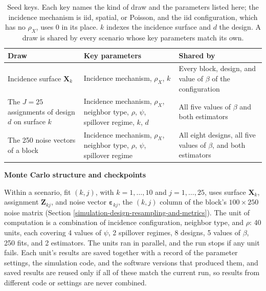 \documentclass[11pt]{article}
\newcommand{\sihead}[1]{\par\medskip\noindent\textbf{#1}\par\nopagebreak\noindent\ignorespaces}
\begin{document}
\begin{table}[!htb]

\small
\centering

\caption{Seed keys. Each key names the kind of draw and the parameters listed here; the incidence mechanism is iid, spatial, or Poisson, and the iid configuration, which has no $\rho_X$, uses 0 in its place. $k$ indexes the incidence surface and $d$ the design. A draw is shared by every scenario whose key parameters match its own.}
\label{tab:seed-keys}

\begin{tabular}{p{4.2cm}p{5.0cm}p{5.2cm}}

\toprule
Draw & Key parameters & Shared by \\

\midrule
Incidence surface $\mathbf{X}_k$ & Incidence mechanism, $\rho_X$, $k$ & Every block, design, and value of $\beta$ of the configuration \\
The $J = 25$ assignments of design $d$ on surface $k$ & Incidence mechanism, $\rho_X$, neighbor type, $\rho$, $\psi$, spillover regime, $k$, $d$ & All five values of $\beta$ and both estimators \\
The 250 noise vectors of a block & Incidence mechanism, $\rho_X$, neighbor type, $\rho$, $\psi$, spillover regime & All eight designs, all five values of $\beta$, and both estimators \\

\bottomrule

\end{tabular}

\end{table}

\sihead{Monte Carlo structure and checkpoints}
Within a scenario, fit
\((k, j)\), with \(k = 1, \dots, 10\) and \(j = 1, \dots, 25\), uses
surface \(\mathbf{X}_k\), assignment \(\mathbf{Z}_{kj}\), and noise vector
\(\boldsymbol{\varepsilon}_{kj}\), the \((k, j)\) column of the block's
\(100 \times 250\) noise matrix (Section \ref{simulation-design-resampling-and-metrics}). The unit of computation is a combination of incidence
configuration, neighbor type, and \(\rho\): 40 units, each covering 4
values of \(\psi\), 2 spillover regimes, 8 designs, 5 values of
\(\beta\), 250 fits, and 2 estimators. The units ran in parallel, and the
run stops if any unit fails. Each unit's results are saved together with
a record of the parameter settings, the simulation code, and the
software versions that produced them, and saved results are reused only
if all of these match the current run, so results from different code or
settings are never combined.
\end{document}
